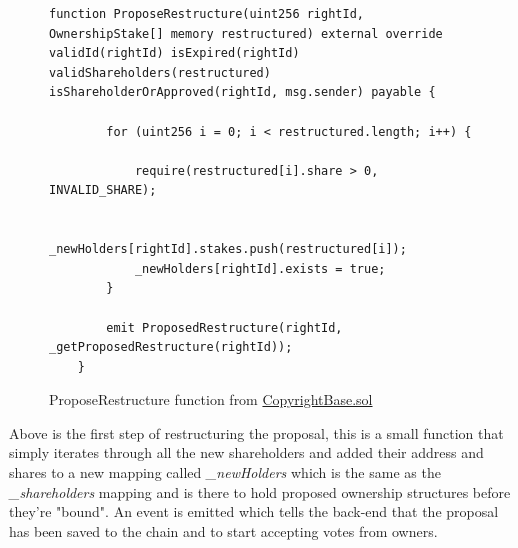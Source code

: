 \documentclass[12pt]{article}
\begin{document}
\begin{figure}[H]
\caption{ProposeRestructure function from \href{https://github.com/MrHarrisonBarker/CRPL/blob/main/CRPL.Contracts/contracts/Copyrights/CopyrightBase.sol}{CopyrightBase.sol}}
\centering
\begin{lstlisting}[language=Solidity]
function ProposeRestructure(uint256 rightId, OwnershipStake[] memory restructured) external override validId(rightId) isExpired(rightId) validShareholders(restructured) isShareholderOrApproved(rightId, msg.sender) payable {
        
        for (uint256 i = 0; i < restructured.length; i++) {

            require(restructured[i].share > 0, INVALID_SHARE);

            _newHolders[rightId].stakes.push(restructured[i]);
            _newHolders[rightId].exists = true;
        }   

        emit ProposedRestructure(rightId, _getProposedRestructure(rightId));
    }	
\end{lstlisting}
\end{figure}

Above is the first step of restructuring the proposal, this is a small function that simply iterates through all the new shareholders and added their address and shares to a new mapping called \textit{\_newHolders} which is the same as the \textit{\_shareholders} mapping and is there to hold proposed ownership structures before they're "bound". An event is emitted which tells the back-end that the proposal has been saved to the chain and to start accepting votes from owners.
\end{document}
